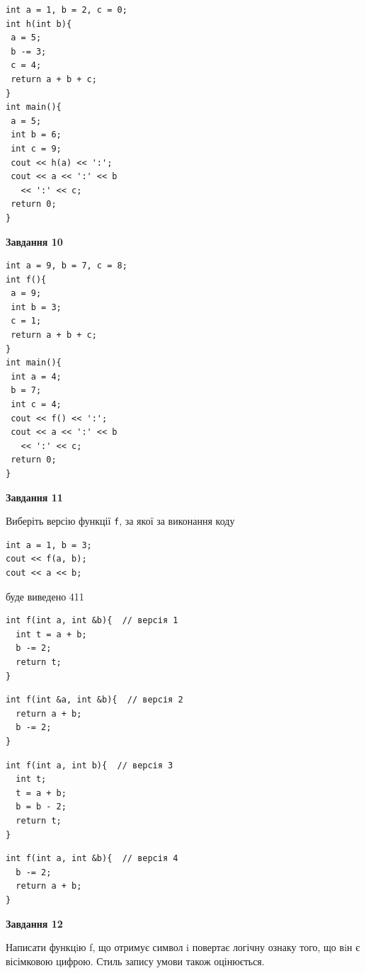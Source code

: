 \documentclass[12pt, ukrainian]{article}
\def\code#1{\Verb!#1!}
\begin{document}
{\begin {large}
\begin{minipage}[t]{7.0cm}
\begin{verbatim}
int a = 1, b = 2, c = 0;
int h(int b){
 a = 5;
 b -= 3;
 c = 4;
 return a + b + c;
}
int main(){
 a = 5;
 int b = 6;
 int c = 9;
 cout << h(a) << ':';
 cout << a << ':' << b 
   << ':' << c;
 return 0;
}
\end{verbatim}



\begin{center}
\textbf{Завдання 10}
\end{center}
\vspace{-8mm}

\begin{verbatim}
int a = 9, b = 7, c = 8;
int f(){
 a = 9;
 int b = 3;
 c = 1;
 return a + b + c;
}
int main(){
 int a = 4;
 b = 7;
 int c = 4;
 cout << f() << ':';
 cout << a << ':' << b 
   << ':' << c;
 return 0;
}
\end{verbatim}

\end{minipage}
\vline \hspace{1mm}
\begin{minipage}[t]{11.0cm}

\begin{center}
\textbf{Завдання 11}
\end{center}
Виберіть версію функції \code{f}, за якої за виконання коду
\begin{verbatim}
int a = 1, b = 3;
cout << f(a, b);
cout << a << b;
\end{verbatim}

буде виведено 411

\begin{verbatim}
int f(int a, int &b){  // версія 1
  int t = a + b;
  b -= 2;
  return t;
}
\end{verbatim}

\vspace{-8mm}\begin{verbatim}
int f(int &a, int &b){  // версія 2
  return a + b;
  b -= 2;
}
\end{verbatim}

\vspace{-8mm}\begin{verbatim}
int f(int a, int b){  // версія 3
  int t;
  t = a + b;
  b = b - 2;
  return t;
}
\end{verbatim}

\vspace{-8mm}\begin{verbatim}
int f(int a, int &b){  // версія 4
  b -= 2;
  return a + b;
}
\end{verbatim}



\begin{center}
\textbf{Завдання 12}
\end{center}

Написати функцiю f, що отримує символ i повертає логічну ознаку того, що вiн є вісімковою цифрою. Стиль запису умови також оцінюється.\par

\end{minipage}

\end {large}}
\newpage
\end{document}
